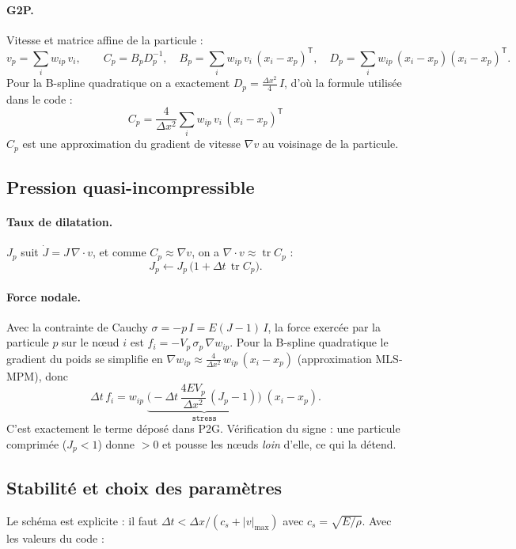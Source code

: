 \documentclass[11pt,a4paper]{article}
\newcommand{\code}[1]{\texttt{\detokenize{#1}}}
\begin{document}
\paragraph{G2P.} Vitesse et matrice affine de la particule :
\[
  v_p = \sum_i w_{ip}\, v_i,\qquad
  C_p = B_p D_p^{-1},\quad
  B_p = \sum_i w_{ip}\, v_i\,(x_i - x_p)^{\mathsf T},\quad
  D_p = \sum_i w_{ip}\,(x_i - x_p)(x_i - x_p)^{\mathsf T}.
\]
Pour la B-spline quadratique on a exactement $D_p = \frac{\Delta x^2}{4}\, I$, d'où la formule
utilisée dans le code :
\[
  \boxed{\;C_p = \frac{4}{\Delta x^2}\sum_i w_{ip}\, v_i\,(x_i - x_p)^{\mathsf T}\;}
\]
$C_p$ est une approximation du gradient de vitesse $\nabla v$ au voisinage de la particule.

\subsection{Pression quasi-incompressible}

\paragraph{Taux de dilatation.} $J_p$ suit $\dot J = J\,\nabla\cdot v$, et comme
$C_p \approx \nabla v$, on a $\nabla\cdot v \approx \operatorname{tr} C_p$ :
\[
  J_p \leftarrow J_p\,\big(1 + \Delta t\,\operatorname{tr} C_p\big).
\]

\paragraph{Force nodale.} Avec la contrainte de Cauchy $\sigma = -p\,I = E(J-1)\,I$, la force
exercée par la particule $p$ sur le n\oe ud $i$ est $f_i = -V_p\,\sigma_p\,\nabla w_{ip}$.
Pour la B-spline quadratique le gradient du poids se simplifie en
$\nabla w_{ip} \approx \frac{4}{\Delta x^2}\,w_{ip}\,(x_i - x_p)$ (approximation MLS-MPM), donc
\[
  \Delta t\, f_i = w_{ip}\;\underbrace{\Big(-\Delta t\,\frac{4 E V_p}{\Delta x^2}\,(J_p - 1)\Big)}_{\texttt{stress}}\;(x_i - x_p).
\]
C'est exactement le terme \code{stress * dpos} déposé dans P2G. Vérification du signe :
une particule comprimée ($J_p < 1$) donne \code{stress} $> 0$ et pousse les n\oe uds
\emph{loin} d'elle, ce qui la détend.

\subsection{Stabilité et choix des paramètres}
\label{sec:stab}

Le schéma est explicite : il faut $\Delta t < \Delta x / (c_s + |v|_{\max})$ avec
$c_s = \sqrt{E/\rho}$. Avec les valeurs du code :
\end{document}
